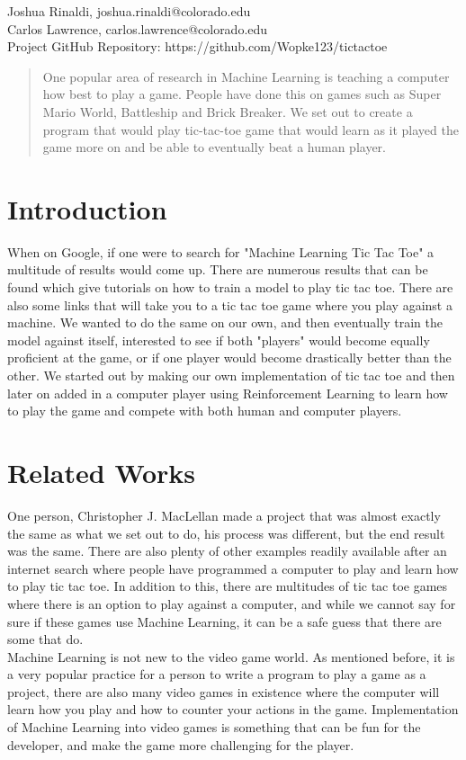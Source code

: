 \documentclass{article}
\begin{document}

\begin{center}
Joshua Rinaldi, joshua.rinaldi@colorado.edu\\
Carlos Lawrence, carlos.lawrence@colorado.edu\\
Project GitHub Repository: https://github.com/Wopke123/tictactoe
\end{center} 
\vskip 0.3in

\begin{abstract}
One popular area of research in Machine Learning is teaching a computer how best to play a game. People have done this on games such as Super Mario World, Battleship and Brick Breaker. We set out to create a program that would play tic-tac-toe game that would learn as it played the game more on and be able to eventually beat a human player.
\end{abstract}

\section{Introduction}
When on Google, if one were to search for "Machine Learning Tic Tac Toe" a multitude of results would come up. There are numerous results that can be found which give tutorials on how to train a model to play tic tac toe. There are also some links that will take you to a tic tac toe game where you play against a machine. We wanted to do the same on our own, and then eventually train the model against itself, interested to see if both "players" would become equally proficient at the game, or if one player would become drastically better than the other. We started out by making our own implementation of tic tac toe and then later on added in a computer player using Reinforcement Learning to learn how to play the game and compete with both human and computer players.

\section{Related Works}
One person, Christopher J. MacLellan made a project that was almost exactly the same as what we set out to do, his process was different, but the end result was the same. There are also plenty of other examples readily available after an internet search where people have programmed a computer to play and learn how to play tic tac toe. In addition to this, there are multitudes of tic tac toe games where there is an option to play against a computer, and while we cannot say for sure if these games use Machine Learning, it can be a safe guess that there are some that do. \\
Machine Learning is not new to the video game world. As mentioned before, it is a very popular practice for a person to write a program to play a game as a project, there are also many video games in existence where the computer will learn how you play and how to counter your actions in the game. Implementation of Machine Learning into video games is something that can be fun for the developer, and make the game more challenging for the player.
\end{document}
